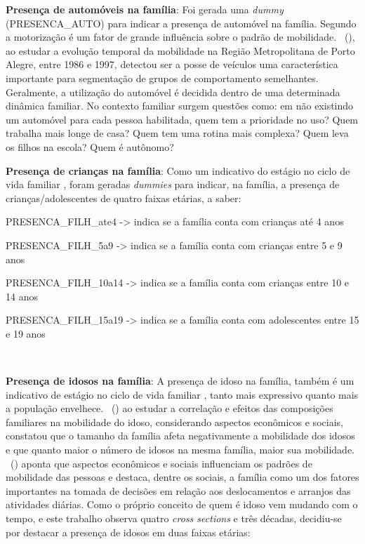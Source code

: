 \begin{compactitem}
\item \textbf{Presença de automóveis na família}: Foi gerada uma \textit{dummy} (PRESENCA_AUTO) para indicar a presença de automóvel na família.
Segundo  a motorização é um fator de grande influência sobre o padrão de mobilidade. 
\ (\citeyear{PEIXOTO2002}), ao estudar a evolução temporal da mobilidade na Região Metropolitana de Porto Alegre, entre 1986 e 1997, detectou ser a posse de veículos uma característica importante para segmentação de grupos de comportamento semelhantes.
Geralmente, a utilização do automóvel é decidida dentro de uma determinada dinâmica familiar.
No contexto familiar surgem questões como: em não existindo um automóvel para cada pessoa habilitada, quem tem a prioridade no uso? Quem trabalha mais longe de casa? Quem tem uma rotina mais complexa? Quem leva os filhos na escola? Quem é autônomo?\\

\item \textbf{Presença de crianças na família}: Como um indicativo do estágio no ciclo de vida familiar \cite{ORTUZAR1994}, foram geradas \textit{dummies} para indicar, na família, a presença de crianças/adolescentes de quatro faixas etárias, a saber: 

    \begin{compactitem}[]
    \item PRESENCA_FILH_ate4 -> indica se a família conta com crianças até 4 anos
    \item PRESENCA_FILH_5a9 -> indica se a família conta com crianças entre 5 e 9 anos
    \item PRESENCA_FILH_10a14 -> indica se a família conta com crianças entre 10 e 14 anos
    \item PRESENCA_FILH_15a19 -> indica se a família conta com adolescentes entre 15 e 19 anos
    \end{compactitem}\

\item \textbf{Presença de idosos na família}: A presença de idoso na família, também é um indicativo de estágio no ciclo de vida familiar \cite{ORTUZAR1994}, tanto mais expressivo quanto mais a população envelhece. 
\ (\citeyear{OLIVEIRA2014}) ao estudar a correlação e efeitos das composições familiares na
mobilidade do idoso, considerando aspectos econômicos e sociais, constatou que o tamanho da família afeta negativamente a mobilidade dos idosos e que quanto maior o número de idosos na mesma família, maior sua mobilidade. 
\ (\citeyear{VASCONCELLOS2001}) aponta que aspectos econômicos e sociais influenciam os padrões de mobilidade das pessoas e destaca, dentre os sociais, a família como um dos fatores importantes na tomada de decisões em relação aos deslocamentos e arranjos das atividades diárias. Como o próprio conceito de quem é idoso vem mudando com o tempo, e este trabalho observa quatro \textit{cross sections} e três décadas, decidiu-se por destacar a presença de idosos em duas faixas etárias:


\end{compactitem}

